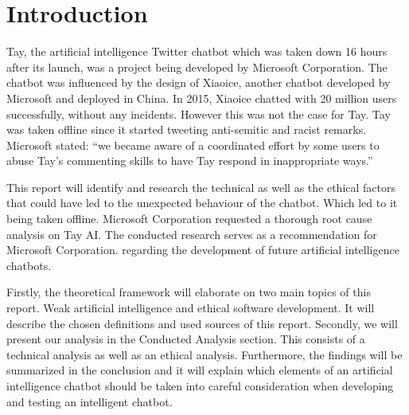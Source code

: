 \chapter{Introduction}

Tay, the artificial intelligence Twitter chatbot which was taken down 16 hours after its launch, was a project being developed by Microsoft Corporation. The chatbot was influenced by the design of Xiaoice, another chatbot developed by Microsoft and deployed in China. In 2015, Xiaoice chatted with 20 million users successfully, without any incidents. However this was not the case for Tay. Tay was taken offline since it started tweeting anti-semitic and racist remarks. Microsoft stated: “we became aware of a coordinated effort by some users to abuse Tay’s commenting skills to have Tay respond in inappropriate ways.”\cite{microsoftstatement}

This report will identify and research the technical as well as the ethical factors that could have led to the unexpected behaviour of the chatbot. Which led to it being taken offline. Microsoft Corporation requested a thorough root cause analysis on Tay AI. The conducted research serves as a recommendation for Microsoft Corporation. regarding the development of future artificial intelligence chatbots. 

Firstly, the theoretical framework will elaborate on two main topics of this report. Weak artificial intelligence and ethical software development. It will describe the chosen definitions and used sources of this report. Secondly, we will present our analysis in the Conducted Analysis section. This consists of a technical analysis as well as an ethical analysis. Furthermore, the findings will be summarized in the conclusion and it will explain which elements of an artificial intelligence chatbot should be taken into careful consideration when developing and testing an intelligent chatbot. 


